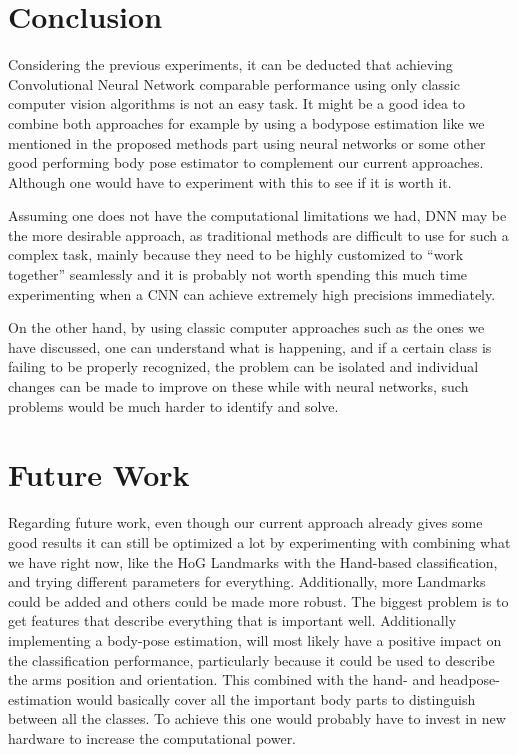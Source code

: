 \documentclass[10pt,twocolumn,letterpaper]{article}
\begin{document}
\section{Conclusion}
Considering the previous experiments, it can be deducted that achieving Convolutional Neural Network comparable performance using only classic computer vision algorithms is not an easy task. It might be a good idea to combine both approaches for example by using a bodypose estimation like we mentioned in the proposed methods part using neural networks or some other good performing body pose estimator to complement our current approaches. Although one would have to experiment with this to see if it is worth it.

Assuming one does not have the computational limitations we had, DNN may be the more desirable approach, as traditional methods are difficult to use for such a complex task, mainly because they need to be highly customized to ``work together'' seamlessly and it is probably not worth spending this much time experimenting when a CNN can achieve extremely high precisions immediately. 

On the other hand, by using classic computer approaches such as the ones we have discussed, one can understand what is happening, and if a certain class is failing to be properly recognized, the problem can be isolated and individual changes can be made to improve on these while with neural networks, such problems would be much harder to identify and solve.


\section{Future Work}
Regarding future work, even though our current approach already gives some good results it can still be optimized a lot by experimenting with combining what we have right now, like the HoG Landmarks with the Hand-based classification, and trying different parameters for everything. Additionally, more Landmarks could be added and others could be made more robust. The biggest problem is to get features that describe everything that is important well. Additionally implementing a body-pose estimation, will most likely have a positive impact on the classification performance, particularly because it could be used to describe the arms position and orientation. This combined with the hand- and headpose-estimation would basically cover all the important body parts to distinguish between all the classes. To achieve this one would probably have to invest in new hardware to increase the computational power.




{\small


}
\end{document}
